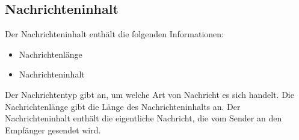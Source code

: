 \subsection{Nachrichteninhalt}

Der Nachrichteninhalt enthält die folgenden Informationen:

\begin{itemize}
    \item Nachrichtenlänge
    \item Nachrichteninhalt
\end{itemize}

\noindent Der Nachrichtentyp gibt an, um welche Art von Nachricht es sich handelt. Die Nachrichtenlänge gibt die Länge des Nachrichteninhalts an. Der Nachrichteninhalt enthält die eigentliche Nachricht, die vom Sender an den Empfänger gesendet wird.